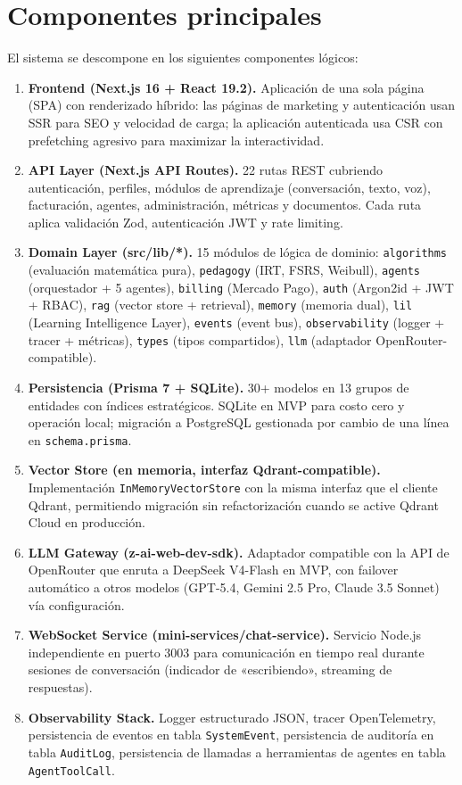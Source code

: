 \documentclass[10pt,a4paper,oneside]{report}
\begin{document}
\section{Componentes principales}
El sistema se descompone en los siguientes componentes lógicos:

\begin{enumerate}[leftmargin=1.6em]
\item \textbf{Frontend (Next.js 16 + React 19.2).} Aplicación de una sola página (SPA) con renderizado híbrido: las páginas de marketing y autenticación usan SSR para SEO y velocidad de carga; la aplicación autenticada usa CSR con prefetching agresivo para maximizar la interactividad.
\item \textbf{API Layer (Next.js API Routes).} 22 rutas REST cubriendo autenticación, perfiles, módulos de aprendizaje (conversación, texto, voz), facturación, agentes, administración, métricas y documentos. Cada ruta aplica validación Zod, autenticación JWT y rate limiting.
\item \textbf{Domain Layer (src/lib/*).} 15 módulos de lógica de dominio: \texttt{algorithms} (evaluación matemática pura), \texttt{pedagogy} (IRT, FSRS, Weibull), \texttt{agents} (orquestador + 5 agentes), \texttt{billing} (Mercado Pago), \texttt{auth} (Argon2id + JWT + RBAC), \texttt{rag} (vector store + retrieval), \texttt{memory} (memoria dual), \texttt{lil} (Learning Intelligence Layer), \texttt{events} (event bus), \texttt{observability} (logger + tracer + métricas), \texttt{types} (tipos compartidos), \texttt{llm} (adaptador OpenRouter-compatible).
\item \textbf{Persistencia (Prisma 7 + SQLite).} 30+ modelos en 13 grupos de entidades con índices estratégicos. SQLite en MVP para costo cero y operación local; migración a PostgreSQL gestionada por cambio de una línea en \texttt{schema.prisma}.
\item \textbf{Vector Store (en memoria, interfaz Qdrant-compatible).} Implementación \texttt{InMemoryVectorStore} con la misma interfaz que el cliente Qdrant, permitiendo migración sin refactorización cuando se active Qdrant Cloud en producción.
\item \textbf{LLM Gateway (z-ai-web-dev-sdk).} Adaptador compatible con la API de OpenRouter que enruta a DeepSeek V4-Flash en MVP, con failover automático a otros modelos (GPT-5.4, Gemini 2.5 Pro, Claude 3.5 Sonnet) vía configuración.
\item \textbf{WebSocket Service (mini-services/chat-service).} Servicio Node.js independiente en puerto 3003 para comunicación en tiempo real durante sesiones de conversación (indicador de «escribiendo», streaming de respuestas).
\item \textbf{Observability Stack.} Logger estructurado JSON, tracer OpenTelemetry, persistencia de eventos en tabla \texttt{SystemEvent}, persistencia de auditoría en tabla \texttt{AuditLog}, persistencia de llamadas a herramientas de agentes en tabla \texttt{AgentToolCall}.
\end{enumerate}
\end{document}
